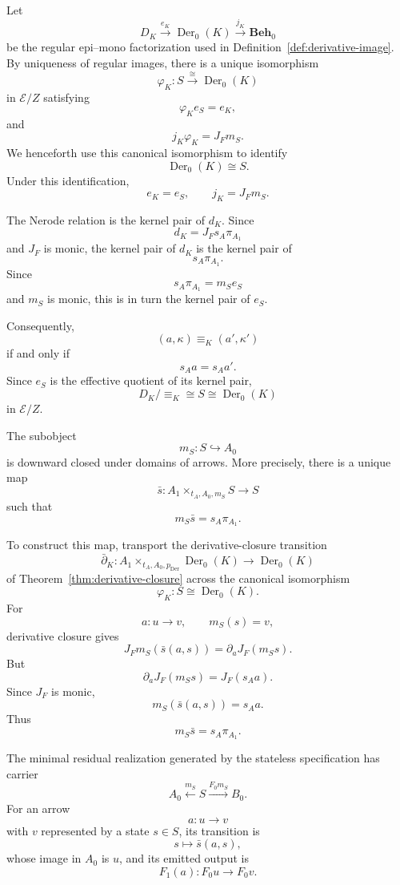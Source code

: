 Let
\[
    D_K
        \xrightarrow{e_K}
    \operatorname{Der}_0(K)
        \xrightarrow{j_K}
    \mathbf{Beh}_0
\]
be the regular epi--mono factorization used in
Definition~\ref{def:derivative-image}. By uniqueness of regular images, there
is a unique isomorphism
\[
    \varphi_K:
    S\overset{\cong}{\longrightarrow}\operatorname{Der}_0(K)
\]
in \(\mathcal E/Z\) satisfying
\[
    \varphi_Ke_S=e_K,
\]
and
\[
    j_K\varphi_K=J_Fm_S.
\]
We henceforth use this canonical isomorphism to identify
\[
    \operatorname{Der}_0(K)\cong S.
\]
Under this identification,
\[
    e_K=e_S,
    \qquad
    j_K=J_Fm_S.
\]

The Nerode relation is the kernel pair of \(d_K\). Since
\[
    d_K=J_Fs_A\pi_{A_1}
\]
and \(J_F\) is monic, the kernel pair of \(d_K\) is the kernel pair of
\[
    s_A\pi_{A_1}.
\]
Since
\[
    s_A\pi_{A_1}=m_Se_S
\]
and \(m_S\) is monic, this is in turn the kernel pair of \(e_S\).

Consequently,
\[
    (a,\kappa)\equiv_K(a',\kappa')
\]
if and only if
\[
    s_Aa=s_Aa'.
\]
Since \(e_S\) is the effective quotient of its kernel pair,
\[
    D_K/{\equiv_K}
    \cong
    S
    \cong
    \operatorname{Der}_0(K)
\]
in \(\mathcal E/Z\).

The subobject
\[
    m_S:S\hookrightarrow A_0
\]
is downward closed under domains of arrows. More precisely, there is a unique
map
\[
    \bar s:
    A_1\times_{t_A,A_0,m_S}S
    \to
    S
\]
such that
\[
    m_S\bar s=s_A\pi_{A_1}.
\]

To construct this map, transport the derivative-closure transition
\[
    \bar\partial_K:
    A_1
    \times_{t_A,A_0,p_{\operatorname{Der}}}
    \operatorname{Der}_0(K)
    \to
    \operatorname{Der}_0(K)
\]
of Theorem~\ref{thm:derivative-closure} across the canonical isomorphism
\[
    \varphi_K:S\cong\operatorname{Der}_0(K).
\]
For
\[
    a:u\to v,
    \qquad
    m_S(s)=v,
\]
derivative closure gives
\[
    J_Fm_S(\bar s(a,s))
    =
    \partial_aJ_F(m_Ss).
\]
But
\[
    \partial_aJ_F(m_Ss)
    =
    J_F(s_Aa).
\]
Since \(J_F\) is monic,
\[
    m_S(\bar s(a,s))
    =
    s_Aa.
\]
Thus
\[
    m_S\bar s=s_A\pi_{A_1}.
\]

The minimal residual realization generated by the stateless specification has
carrier
\[
    A_0
    \xleftarrow{m_S}
    S
    \xrightarrow{F_0m_S}
    B_0.
\]
For an arrow
\[
    a:u\to v
\]
with \(v\) represented by a state \(s\in S\), its transition is
\[
    s\longmapsto\bar s(a,s),
\]
whose image in \(A_0\) is \(u\), and its emitted output is
\[
    F_1(a):F_0u\to F_0v.
\]

